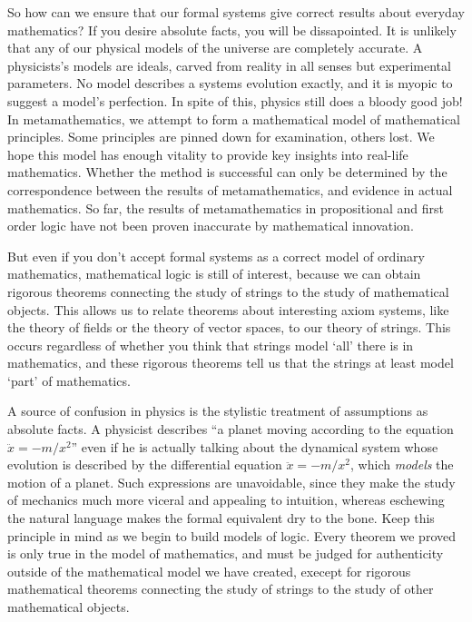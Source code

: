 So how can we ensure that our formal systems give correct results about everyday mathematics? If you desire absolute facts, you will be dissapointed. It is unlikely that any of our physical models of the universe are completely accurate. A physicists's models are ideals, carved from reality in all senses but experimental parameters. No model describes a systems evolution exactly, and it is myopic to suggest a model's perfection. In spite of this, physics still does a bloody good job! In metamathematics, we attempt to form a mathematical model of mathematical principles. Some principles are pinned down for examination, others lost. We hope this model has enough vitality to provide key insights into real-life mathematics. Whether the method is successful can only be determined by the correspondence between the results of metamathematics, and evidence in actual mathematics. So far, the results of metamathematics in propositional and first order logic have not been proven inaccurate by mathematical innovation.

But even if you don't accept formal systems as a correct model of ordinary mathematics, mathematical logic is still of interest, because we can obtain rigorous theorems connecting the study of strings to the study of mathematical objects. This allows us to relate theorems about interesting axiom systems, like the theory of fields or the theory of vector spaces, to our theory of strings. This occurs regardless of whether you think that strings model `all' there is in mathematics, and these rigorous theorems tell us that the strings at least model `part' of mathematics.

A source of confusion in physics is the stylistic treatment of assumptions as absolute facts. A physicist describes ``a planet moving according to the equation $\ddot{x} = -m/x^2$'' even if he is actually talking about the dynamical system whose evolution is described by the differential equation $\ddot{x} = -m/x^2$, which {\it models} the motion of a planet. Such expressions are unavoidable, since they make the study of mechanics much more viceral and appealing to intuition, whereas eschewing the natural language makes the formal equivalent dry to the bone. Keep this principle in mind as we begin to build models of logic. Every theorem we proved is only true in the model of mathematics, and must be judged for authenticity outside of the mathematical model we have created, execept for rigorous mathematical theorems connecting the study of strings to the study of other mathematical objects.






